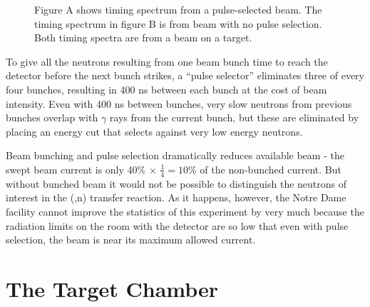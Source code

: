 \begin{figure}[htp]
\centering
{}
\label{fig:PSvsNPS_TOF}
\caption{Figure A shows timing spectrum from a pulse-selected beam.  The timing spectrum in figure B is from beam with no pulse selection.  Both timing spectra are from a  beam on a  target.}
\end{figure}

To give all the neutrons resulting from one beam bunch time to reach the detector before the next bunch strikes, a ``pulse selector'' eliminates three of every four bunches, resulting in 400 ns between each bunch at the cost of beam intensity.  Even with 400 ns between bunches, very slow neutrons from previous bunches overlap with $\gamma$ rays from the current bunch, but these are eliminated by placing an energy cut that selects against very low energy neutrons.


Beam bunching and pulse selection dramatically reduces available beam - the swept beam current is only 40\% $\times$ $\frac{1}{4} = 10$\% of the non-bunched current.  But without bunched beam it would not be possible to distinguish the neutrons of interest in the (,n) transfer reaction.  As it happens, however, the Notre Dame facility cannot improve the statistics of this experiment by very much because the radiation limits on the room with the detector are so low that even with pulse selection, the beam is near its maximum allowed current.

\section{The Target Chamber}

